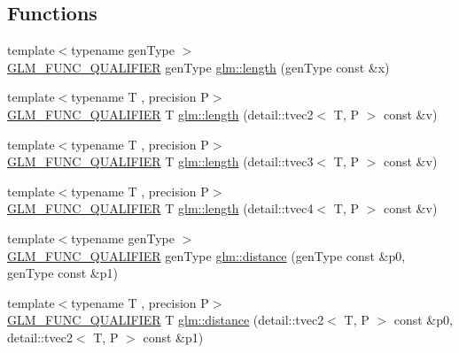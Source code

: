 \subsection*{Functions}
\begin{DoxyCompactItemize}
\item 
{\footnotesize template$<$typename gen\+Type $>$ }\\\hyperlink{setup_8hpp_a33fdea6f91c5f834105f7415e2a64407}{G\+L\+M\+\_\+\+F\+U\+N\+C\+\_\+\+Q\+U\+A\+L\+I\+F\+I\+ER} gen\+Type \hyperlink{group__core__func__geometric_ga03b2831439defb8922832b540b91b8a7}{glm\+::length} (gen\+Type const \&x)
\item 
{\footnotesize template$<$typename T , precision P$>$ }\\\hyperlink{setup_8hpp_a33fdea6f91c5f834105f7415e2a64407}{G\+L\+M\+\_\+\+F\+U\+N\+C\+\_\+\+Q\+U\+A\+L\+I\+F\+I\+ER} T \hyperlink{namespaceglm_a2b1957c9c773e5f63c0e843c732000a3}{glm\+::length} (detail\+::tvec2$<$ T, P $>$ const \&v)
\item 
{\footnotesize template$<$typename T , precision P$>$ }\\\hyperlink{setup_8hpp_a33fdea6f91c5f834105f7415e2a64407}{G\+L\+M\+\_\+\+F\+U\+N\+C\+\_\+\+Q\+U\+A\+L\+I\+F\+I\+ER} T \hyperlink{namespaceglm_a9b77c44ed4ba8ed4842e50ae90676aa8}{glm\+::length} (detail\+::tvec3$<$ T, P $>$ const \&v)
\item 
{\footnotesize template$<$typename T , precision P$>$ }\\\hyperlink{setup_8hpp_a33fdea6f91c5f834105f7415e2a64407}{G\+L\+M\+\_\+\+F\+U\+N\+C\+\_\+\+Q\+U\+A\+L\+I\+F\+I\+ER} T \hyperlink{namespaceglm_a10caf4973f213ff24dd3d103d8756562}{glm\+::length} (detail\+::tvec4$<$ T, P $>$ const \&v)
\item 
{\footnotesize template$<$typename gen\+Type $>$ }\\\hyperlink{setup_8hpp_a33fdea6f91c5f834105f7415e2a64407}{G\+L\+M\+\_\+\+F\+U\+N\+C\+\_\+\+Q\+U\+A\+L\+I\+F\+I\+ER} gen\+Type \hyperlink{group__core__func__geometric_ga00716eae37e8ae2a76ca7799f9c75682}{glm\+::distance} (gen\+Type const \&p0, gen\+Type const \&p1)
\item 
{\footnotesize template$<$typename T , precision P$>$ }\\\hyperlink{setup_8hpp_a33fdea6f91c5f834105f7415e2a64407}{G\+L\+M\+\_\+\+F\+U\+N\+C\+\_\+\+Q\+U\+A\+L\+I\+F\+I\+ER} T \hyperlink{namespaceglm_a7ad95124e1674eaaffae23b7988de4ee}{glm\+::distance} (detail\+::tvec2$<$ T, P $>$ const \&p0, detail\+::tvec2$<$ T, P $>$ const \&p1)
\item 

\end{DoxyCompactItemize}
